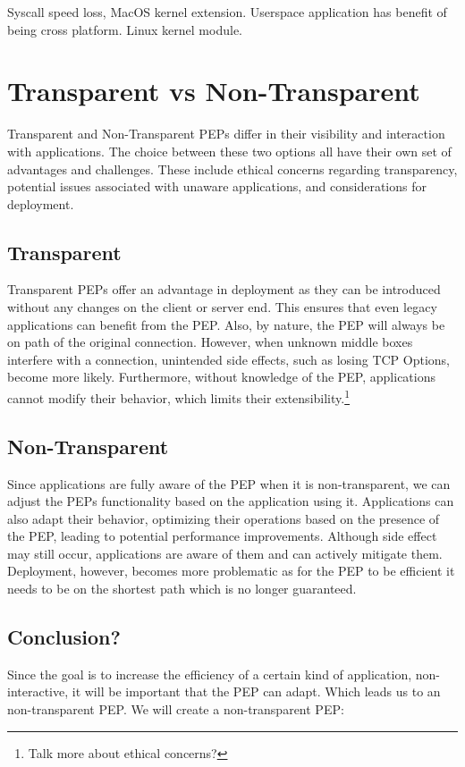 \documentclass[a4paper,english, 11pt]{report}
\begin{document}
Syscall speed loss, MacOS kernel extension. Userspace application has benefit of being cross platform.
Linux kernel module.


\section{Transparent vs Non-Transparent}
Transparent and Non-Transparent PEPs differ in their visibility and interaction with applications. The choice between these two options all have their own set of advantages and challenges. These include ethical concerns regarding transparency, potential issues associated with unaware applications, and considerations for deployment.

\subsection{Transparent}
Transparent PEPs offer an advantage in deployment as they can be introduced without any changes on the client or server end. This ensures that even legacy applications can benefit from the PEP. Also, by nature, the PEP will always be on path of the original connection. However, when unknown middle boxes interfere with a connection, unintended side effects, such as losing TCP Options, become more likely. Furthermore, without knowledge of the PEP, applications cannot modify their behavior, which limits their extensibility.\footnote{Talk more about ethical concerns?}

\subsection{Non-Transparent}
Since applications are fully aware of the PEP when it is non-transparent, we can adjust the PEPs functionality based on the application using it. Applications can also adapt their behavior, optimizing their operations based on the presence of the PEP, leading to potential performance improvements. Although side effect may still occur, applications are aware of them and can actively mitigate them.
Deployment, however, becomes more problematic as for the PEP to be efficient it needs to be on the shortest path which is no longer guaranteed.

\subsection{Conclusion?}
Since the goal is to increase the efficiency of a certain kind of application, non-interactive, it will be important that the PEP can adapt. Which leads us to an non-transparent PEP.
We will create a non-transparent PEP:
\end{document}
